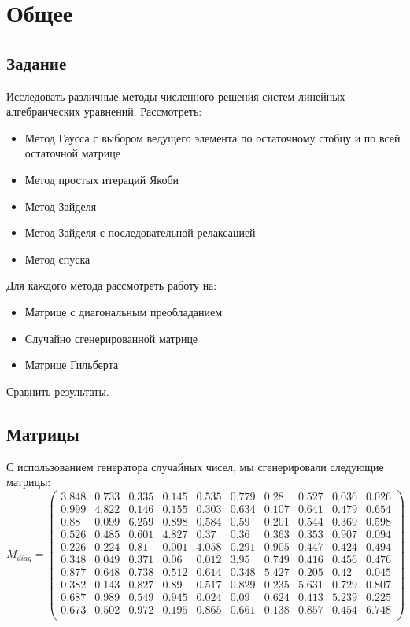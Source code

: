 \documentclass[../../report.tex]{subfiles}
\begin{document}
\chapter{Общее}

\section{Задание}
    Исследовать различные методы численного решения систем линейных алгебраических уравнений.
    Рассмотреть: 
    \begin{itemize}
        \item Метод Гаусса с выбором ведущего элемента по остаточному стобцу и по всей остаточной матрице
        \item Метод простых итераций Якоби
        \item Метод Зайделя
        \item Метод Зайделя с последовательной релаксацией
        \item Метод спуска
    \end{itemize}

    Для каждого метода рассмотреть работу на:
    \begin{itemize}
        \item Матрице с диагональным преобладанием
        \item Случайно сгенерированной матрице
        \item Матрице Гильберта
    \end{itemize}
    Сравнить результаты.

\section{Матрицы}
    С использованием генератора случайных чисел, мы сгенерировали следующие матрицы:
\[
    M_{diag} = 
    \begin{pmatrix}
        3.848 & 0.733 & 0.335 & 0.145 & 0.535 & 0.779 & 0.28  & 0.527 & 0.036 & 0.026 \\
        0.999 & 4.822 & 0.146 & 0.155 & 0.303 & 0.634 & 0.107 & 0.641 & 0.479 & 0.654 \\
        0.88  & 0.099 & 6.259 & 0.898 & 0.584 & 0.59  & 0.201 & 0.544 & 0.369 & 0.598 \\
        0.526 & 0.485 & 0.601 & 4.827 & 0.37  & 0.36  & 0.363 & 0.353 & 0.907 & 0.094 \\
        0.226 & 0.224 & 0.81  & 0.001 & 4.058 & 0.291 & 0.905 & 0.447 & 0.424 & 0.494 \\
        0.348 & 0.049 & 0.371 & 0.06  & 0.012 & 3.95  & 0.749 & 0.416 & 0.456 & 0.476 \\
        0.877 & 0.648 & 0.738 & 0.512 & 0.614 & 0.348 & 5.427 & 0.205 & 0.42  & 0.045 \\
        0.382 & 0.143 & 0.827 & 0.89  & 0.517 & 0.829 & 0.235 & 5.631 & 0.729 & 0.807 \\
        0.687 & 0.989 & 0.549 & 0.945 & 0.024 & 0.09  & 0.624 & 0.413 & 5.239 & 0.225 \\
        0.673 & 0.502 & 0.972 & 0.195 & 0.865 & 0.661 & 0.138 & 0.857 & 0.454 & 6.748 \\

    \end{pmatrix}
\] 
\end{document}
